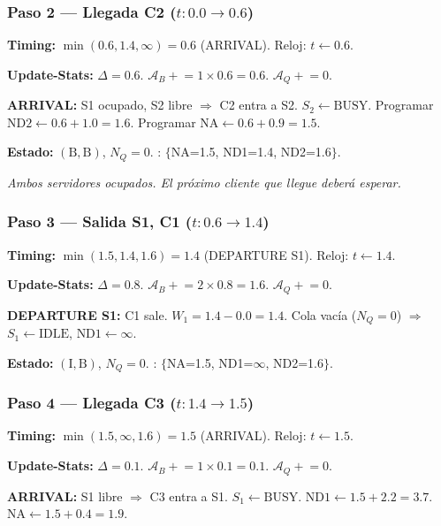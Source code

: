 \documentclass[11pt, letterpaper]{article}
\begin{document}
\subsubsection*{Paso 2 --- Llegada C2 ($t: 0.0 \to 0.6$)}

\textbf{Timing:} $\min(0.6, 1.4, \infty) = 0.6$ (ARRIVAL). Reloj: $t \leftarrow 0.6$.

\textbf{Update-Stats:} $\Delta = 0.6$. $\mathcal{A}_B \mathrel{+}= 1 \times 0.6 = 0.6$. $\mathcal{A}_Q \mathrel{+}= 0$.

\textbf{ARRIVAL:} S1 ocupado, S2 libre $\Rightarrow$ C2 entra a S2. $S_2 \leftarrow \text{BUSY}$. Programar $\text{ND2} \leftarrow 0.6 + 1.0 = 1.6$. Programar $\text{NA} \leftarrow 0.6 + 0.9 = 1.5$.

\textbf{Estado:} $(\text{B}, \text{B})$, $N_Q = 0$. \quad \FEL: $\{$NA=1.5, ND1=1.4, ND2=1.6$\}$.

\emph{Ambos servidores ocupados. El próximo cliente que llegue deberá esperar.}

\subsubsection*{Paso 3 --- Salida S1, C1 ($t: 0.6 \to 1.4$)}

\textbf{Timing:} $\min(1.5, 1.4, 1.6) = 1.4$ (DEPARTURE S1). Reloj: $t \leftarrow 1.4$.

\textbf{Update-Stats:} $\Delta = 0.8$. $\mathcal{A}_B \mathrel{+}= 2 \times 0.8 = 1.6$. $\mathcal{A}_Q \mathrel{+}= 0$.

\textbf{DEPARTURE S1:} C1 sale. $W_1 = 1.4 - 0.0 = 1.4$. Cola vacía ($N_Q = 0$) $\Rightarrow$ $S_1 \leftarrow \text{IDLE}$, $\text{ND1} \leftarrow \infty$.

\textbf{Estado:} $(\text{I}, \text{B})$, $N_Q = 0$. \quad \FEL: $\{$NA=1.5, ND1=$\infty$, ND2=1.6$\}$.

\subsubsection*{Paso 4 --- Llegada C3 ($t: 1.4 \to 1.5$)}

\textbf{Timing:} $\min(1.5, \infty, 1.6) = 1.5$ (ARRIVAL). Reloj: $t \leftarrow 1.5$.

\textbf{Update-Stats:} $\Delta = 0.1$. $\mathcal{A}_B \mathrel{+}= 1 \times 0.1 = 0.1$. $\mathcal{A}_Q \mathrel{+}= 0$.

\textbf{ARRIVAL:} S1 libre $\Rightarrow$ C3 entra a S1. $S_1 \leftarrow \text{BUSY}$. $\text{ND1} \leftarrow 1.5 + 2.2 = 3.7$. $\text{NA} \leftarrow 1.5 + 0.4 = 1.9$.
\end{document}

